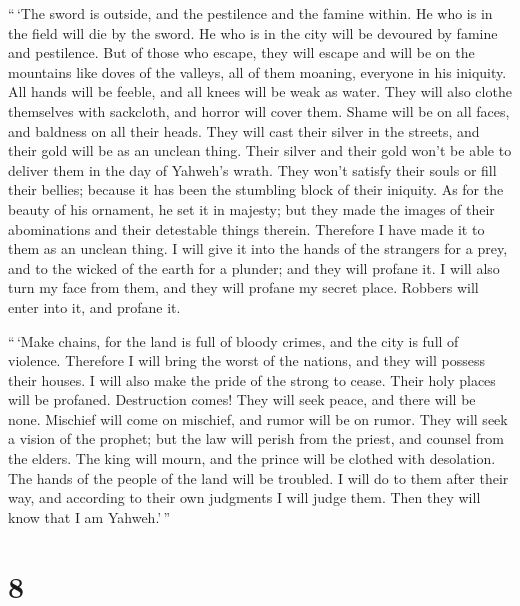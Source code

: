  ``\,`The sword is outside, and the pestilence and the
famine within. He who is in the field will die by the sword. He who is
in the city will be devoured by famine and pestilence.  But
of those who escape, they will escape and will be on the mountains like
doves of the valleys, all of them moaning, everyone in his iniquity.
 All hands will be feeble, and all knees will be weak as
water.  They will also clothe themselves with sackcloth,
and horror will cover them. Shame will be on all faces, and baldness on
all their heads.  They will cast their silver in the
streets, and their gold will be as an unclean thing. Their silver and
their gold won't be able to deliver them in the day of Yahweh's wrath.
They won't satisfy their souls or fill their bellies; because it has
been the stumbling block of their iniquity.  As for the
beauty of his ornament, he set it in majesty; but they made the images
of their abominations and their detestable things therein. Therefore I
have made it to them as an unclean thing.  I will give it
into the hands of the strangers for a prey, and to the wicked of the
earth for a plunder; and they will profane it.  I will also
turn my face from them, and they will profane my secret place. Robbers
will enter into it, and profane it.

 ``\,`Make chains, for the land is full of bloody crimes,
and the city is full of violence.  Therefore I will bring
the worst of the nations, and they will possess their houses. I will
also make the pride of the strong to cease. Their holy places will be
profaned.  Destruction comes! They will seek peace, and
there will be none.  Mischief will come on mischief, and
rumor will be on rumor. They will seek a vision of the prophet; but the
law will perish from the priest, and counsel from the elders.
 The king will mourn, and the prince will be clothed with
desolation. The hands of the people of the land will be troubled. I will
do to them after their way, and according to their own judgments I will
judge them. Then they will know that I am Yahweh.'\,''

\hypertarget{section-6}{%
\section{8}\label{section-6}}

